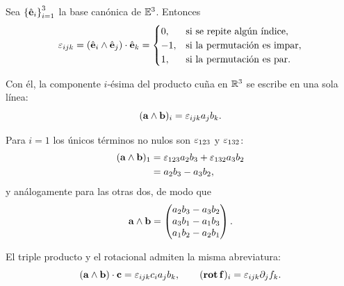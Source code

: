 \begin{definicion}
  \label{def:levi_civita}
  Sea $\left\{ \hat{\mathbf{e}}_i \right\}_{i=1}^{3}$ la base can\'onica de $\mathbb{E}^3$. Entonces
  \begin{equation}
    \label{eq:levi_civita}
    \varepsilon_{ijk}=(\hat{\mathbf{e}}_i\wedge\hat{\mathbf{e}}_j)\cdot\hat{\mathbf{e}}_k=
    \begin{cases}
      0, & \text{si se repite alg\'un \'indice},\\
      -1, & \text{si la permutaci\'on es impar},\\
      1, & \text{si la permutaci\'on es par}.
    \end{cases}
  \end{equation}
\end{definicion}

Con \'el, la componente $i$-\'esima del producto cu\~na en $\mathbb{R}^3$ se escribe en
una sola l\'inea:
\begin{equation}
  \label{eq:cuna_levicivita}
  (\mathbf{a}\wedge\mathbf{b})_i=\varepsilon_{ijk}a_jb_k .
\end{equation}

\begin{ejemplo}
  \label{ej:cuna_componentes}
  Para $i=1$ los \'unicos t\'erminos no nulos son $\varepsilon_{123}$ y $\varepsilon_{132}$:
  \begin{equation}
    \label{eq:cuna_primera_componente}
    \begin{aligned}
      (\mathbf{a}\wedge\mathbf{b})_1
        &=\varepsilon_{123}a_2b_3+\varepsilon_{132}a_3b_2\\
        &=a_2b_3-a_3b_2 ,
    \end{aligned}
  \end{equation}
  y an\'alogamente para las otras dos, de modo que
  \begin{equation}
    \label{eq:cuna_3d}
    \mathbf{a}\wedge\mathbf{b}=
    \begin{pmatrix}
      a_2b_3-a_3b_2\\
      a_3b_1-a_1b_3\\
      a_1b_2-a_2b_1
    \end{pmatrix}.
  \end{equation}
\end{ejemplo}

El triple producto y el rotacional admiten la misma abreviatura:
\begin{equation}
  \label{eq:triple_producto}
  (\mathbf{a}\wedge\mathbf{b})\cdot\mathbf{c}=\varepsilon_{ijk}c_ia_jb_k,
  \qquad
  (\operatorname{\mathbf{rot}}\mathbf{f})_i=\varepsilon_{ijk}\partial_jf_k .
\end{equation}
